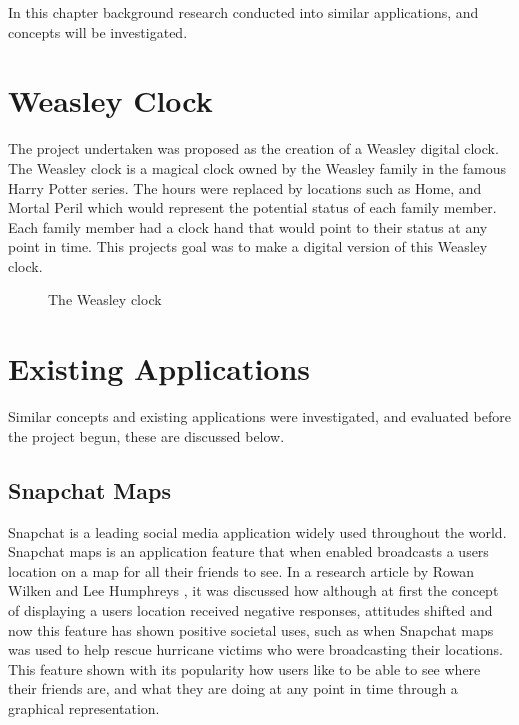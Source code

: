 In this chapter background research conducted into similar applications, and concepts will be investigated. 
\section{Weasley Clock}

The project undertaken was proposed as the creation of a Weasley digital clock. The Weasley clock is a magical clock owned by the Weasley family in the famous Harry Potter series. The hours were replaced by locations such as Home, and Mortal Peril which would represent the potential status of each family member. Each family member had a clock hand that would point to their status at any point in time. This projects goal was to make a digital version of this Weasley clock. 
\begin{figure}[!htbp]
    \centering
    \begin{subfigure}[b]{0.25\textwidth}
    \end{subfigure}
    \caption[The Weasley clock]{The Weasley clock \cite{weasClockWiki}}
    \label{fig:weasClock}
\end{figure}
\FloatBarrier

\section{Existing Applications}
Similar concepts and existing applications were investigated, and evaluated before the project begun, these are discussed below. 


\subsection{Snapchat Maps}
Snapchat is a leading social media application widely used throughout the world. Snapchat maps is an application feature that when enabled broadcasts a users location on a map for all their friends to see. In a research article by Rowan Wilken and Lee Humphreys \cite{snapMaps}, it was discussed how although at first the concept of displaying a users location received negative responses, attitudes shifted and now this feature has shown positive societal uses, such as when Snapchat maps was used to help rescue hurricane victims who were broadcasting their locations. This feature shown with its popularity how users like to be able to see where their friends are, and what they are doing at any point in time through a graphical representation. 

